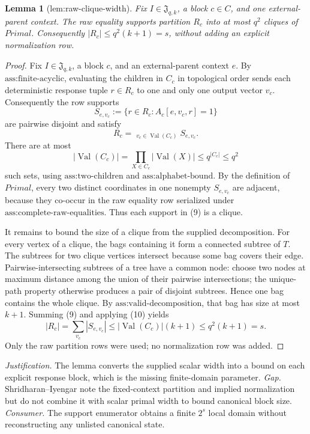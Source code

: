 \documentclass{article}
\newtheorem{lemma}{Lemma}
\begin{document}
\begin{lemma}[lem:raw-clique-width]\label{lem:raw-clique-width}
Fix \(I\in\mathfrak J_{q,k}\), a block \(c\in C\), and one external-parent context. The raw equality supports partition \(R_c\) into at most \(q^2\) cliques of \(Primal\). Consequently \(|R_c|\le q^2(k+1)=s\), without adding an explicit normalization row.
\end{lemma}
\begin{proof}
Fix \(I\in\mathfrak J_{q,k}\), a block \(c\), and an external-parent context \(e\).  By \(\text{ass:finite-acyclic}\), evaluating the children in \(C_c\) in topological order sends each deterministic response tuple \(r\in R_c\) to one and only one output vector \(v_c\).  Consequently the row supports
\[
S_{e,v_c}:=\{r\in R_c:A_c[e,v_c,r]=1\}
\]
are pairwise disjoint and satisfy
\[
R_c=\mathop{\dot\bigcup}_{v_c\in\operatorname{Val}(C_c)}S_{e,v_c}. \tag{9}
\]
There are at most
\[
|\operatorname{Val}(C_c)|
=\prod_{X\in C_c}|\operatorname{Val}(X)|
\le q^{|C_c|}\le q^2 \tag{10}
\]
such sets, using \(\text{ass:two-children}\) and \(\text{ass:alphabet-bound}\).  By the definition of \(Primal\), every two distinct coordinates in one nonempty \(S_{e,v_c}\) are adjacent, because they co-occur in the raw equality row serialized under \(\text{ass:complete-raw-equalities}\).  Thus each support in (9) is a clique.

It remains to bound the size of a clique from the supplied decomposition.  For every vertex of a clique, the bags containing it form a connected subtree of \(T\).  The subtrees for two clique vertices intersect because some bag covers their edge.  Pairwise-intersecting subtrees of a tree have a common node: choose two nodes at maximum distance among the union of their pairwise intersections; the unique-path property otherwise produces a pair of disjoint subtrees.  Hence one bag contains the whole clique.  By \(\text{ass:valid-decomposition}\), that bag has size at most \(k+1\).  Summing (9) and applying (10) yields
\[
|R_c|=\sum_{v_c}|S_{e,v_c}|
\le |\operatorname{Val}(C_c)|(k+1)
\le q^2(k+1)=s. \tag{11}
\]
Only the raw partition rows were used; no normalization row was added.
\end{proof}
\par\smallskip\noindent \textit{Justification.} The lemma converts the supplied scalar width into a bound on each explicit response block, which is the missing finite-domain parameter. \textit{Gap.} Shridharan--Iyengar note the fixed-context partition and implied normalization but do not combine it with scalar primal width to bound canonical block size. \textit{Consumer.} The support enumerator obtains a finite \(2^s\) local domain without reconstructing any unlisted canonical state.
\end{document}
